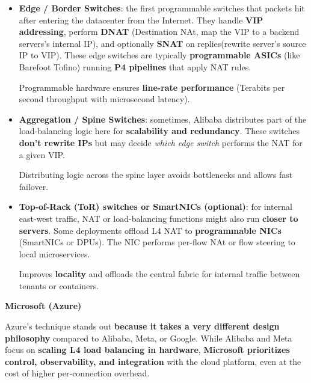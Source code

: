 \begin{itemize}
    \item \textbf{Edge / Border Switches}: the first programmable switches that packets hit after entering the datacenter from the Internet. They handle \textbf{VIP addressing}, perform \textbf{DNAT} (Destination NAt, map the VIP to a backend servers's internal IP), and optionally \textbf{SNAT} on replies(rewrite server's source IP to VIP). These edge switches are typically \textbf{programmable ASICs} (like Barefoot Tofino) running \textbf{P4 pipelines} that apply NAT rules.

    \textcolor{Green3}{} Programmable hardware ensures \textbf{line-rate performance} (Terabits per second throughput with microsecond latency).
    \item \textbf{Aggregation / Spine Switches}: sometimes, Alibaba distributes part of the load-balancing logic here for \textbf{scalability and redundancy}. These switches \textbf{don't rewrite IPs} but may decide \emph{which edge switch} performs the NAT for a given VIP.

    \textcolor{Green3}{} Distributing logic across the spine layer avoids bottlenecks and allows fast failover.
    \item \textbf{Top-of-Rack (ToR) switches or SmartNICs (optional)}: for internal east-west traffic, NAT or load-balancing functions might also run \textbf{closer to servers}. Some deployments offload L4 NAT to \textbf{programmable NICs} (SmartNICs or DPUs). The NIC performs per-flow NAt or flow steering to local microservices.

    \textcolor{Green3}{} Improves \textbf{locality} and offloads the central fabric for internal traffic between tenants or containers.
\end{itemize}

\highspace
\begin{flushleft}
    \textcolor{Green3}{ \textbf{Microsoft (Azure)}}
\end{flushleft}
Azure's technique stands out \textbf{because it takes a very different design philosophy} compared to Alibaba, Meta, or Google. While Alibaba and Meta focus on \textbf{scaling L4 load balancing in hardware}, \textbf{Microsoft prioritizes control, observability, and integration} with the cloud platform, even at the cost of higher per-connection overhead.

